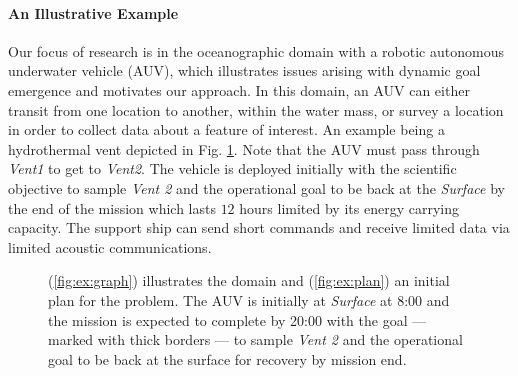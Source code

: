 \paragraph{An Illustrative Example} 

Our focus of research is in the oceanographic domain with a robotic
autonomous underwater vehicle (AUV), which illustrates issues arising with
dynamic goal emergence and motivates our approach.  In this domain, an
AUV can either transit from one location to another, within the water
mass, or survey a location in order to collect data about a feature of
interest.  An example being a hydrothermal vent depicted in
Fig. \ref{fig:Example}.  Note that the AUV must pass through {\em
  Vent1} to get to {\em Vent2}.  The vehicle is deployed initially
with the scientific objective to sample {\em Vent 2} and the
operational goal to be back at the {\em Surface} by the end of the
mission which lasts $12$ hours limited by its energy carrying
capacity. The support ship can send short commands and receive limited
data via limited acoustic communications.

\begin{figure}[!t]
  \centering
  \hfill {}
  \caption{\small{(\ref{fig:ex:graph}) illustrates the domain and
      (\ref{fig:ex:plan}) an initial plan for the problem. The AUV is
      initially at {\em Surface} at 8:00 and the mission is expected
      to complete by 20:00 with the goal --- marked with thick borders
      --- to sample {\em Vent 2} and the operational goal to be back
      at the surface for recovery by mission end.}}
  \label{fig:Example}
  \vskip-2mm
\end{figure}

